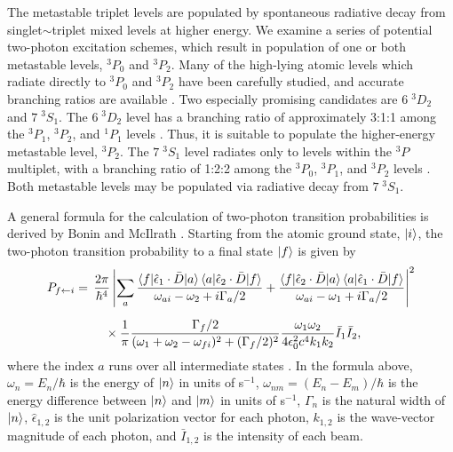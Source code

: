The metastable triplet levels are populated by spontaneous radiative
decay from singlet$\sim$triplet mixed levels at higher energy.  We
examine a series of potential two-photon excitation schemes, which
result in population of one or both metastable levels, $^3P_0$ and
$^3P_2$.  Many of the high-lying atomic levels which radiate directly
to $^3P_0$ and $^3P_2$ have been carefully studied, and accurate
branching ratios are available \cite{benck89}.  Two especially
promising candidates are $6 \; ^3D_2$ and $7 \; ^3S_1$.  The $6 \;
^3D_2$ level has a branching ratio of approximately 3:1:1 among the
$^3P_1$, $^3P_2$, and $^1P_1$ levels \cite{benck89}.  Thus, it is
suitable to populate the higher-energy metastable level, $^3P_2$.  The
$7 \; ^3S_1$ level radiates only to levels within the $^3P$ multiplet,
with a branching ratio of 1:2:2 among the $^3P_0$, $^3P_1$, and
$^3P_2$ levels \cite{benck89}.  Both metastable levels may be
populated via radiative decay from $7 \; ^3S_1$.

A general formula for the calculation of two-photon transition
probabilities is derived by Bonin and McIlrath \cite{bonin84}.
Starting from the atomic ground state, $\mathinner{|{i}\rangle}$, the two-photon
transition probability to a final state $\mathinner{|{f}\rangle}$ is given by
\begin{equation}
  \label{eq:tpa-prob}
  \begin{split}
    P_{f \leftarrow i} = &\: \: \frac{2 \pi}{\hbar^4}
    \left \lvert
      \sum_a
      \frac{
        \mathinner{\langle{f|\hat{\epsilon}_1 \cdot \bar{D}|a}\rangle}\mathinner{\langle{a|\hat{\epsilon}_2 \cdot \bar{D}|f}\rangle}
      }{
        \omega_{ai} - \omega_2 + i \Gamma_a / 2
      } + \frac{
        \mathinner{\langle{f|\hat{\epsilon}_2 \cdot \bar{D}|a}\rangle}\mathinner{\langle{a|\hat{\epsilon}_1 \cdot \bar{D}|f}\rangle}
      }{
        \omega_{ai} - \omega_1 + i \Gamma_a / 2
      }
    \right \rvert ^2\\[2mm]
    & \: \: \: \: \: \: \times 
      \frac{1}{\pi} 
      \frac{
        \Gamma_f / 2
      }{
        (\omega_1 + \omega_2 - \omega_{fi})^2+(\Gamma_f/2)^2
      } \frac{
        \omega_1 \omega_2
      }{
        4 \epsilon_0^2 c^4 k_1 k_2
      } \bar{I}_1 \bar{I}_2,\\
  \end{split}
\end{equation}
where the index $a$ runs over all intermediate states \cite{bonin84,
  grynberg77}.  In the formula above, $\omega_n = E_n / \hbar$ is the
energy of $\mathinner{|{n}\rangle}$ in units of s$^{-1}$, $\omega_{nm} = (E_n -
E_m)/\hbar$ is the energy difference between $\mathinner{|{n}\rangle}$ and $\mathinner{|{m}\rangle}$
in units of s$^{-1}$, $\Gamma_n$ is the natural width of $\mathinner{|{n}\rangle}$,
$\hat{\epsilon}_{1,2}$ is the unit polarization vector for each
photon, $k_{1,2}$ is the wave-vector magnitude of each photon, and
$\bar{I}_{1,2}$ is the intensity of each beam.

